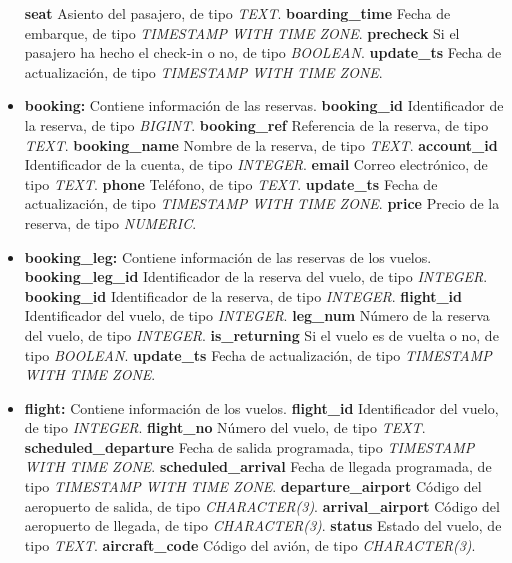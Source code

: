 \documentclass[11pt]{report}
\begin{document}
\begin{itemize}
    \subitem \textbf{seat} Asiento del pasajero, de tipo \emph{TEXT}.
    \subitem \textbf{boarding\_time} Fecha de embarque, de tipo \emph{TIMESTAMP WITH TIME ZONE}.
    \subitem \textbf{precheck} Si el pasajero ha hecho el check-in o no, de tipo \emph{BOOLEAN}.
    \subitem \textbf{update\_ts} Fecha de actualización, de tipo \emph{TIMESTAMP WITH TIME ZONE}.
  \item \textbf{booking:} Contiene información de las reservas.
    \subitem \textbf{booking\_id} Identificador de la reserva, de tipo \emph{BIGINT}.
    \subitem \textbf{booking\_ref} Referencia de la reserva, de tipo \emph{TEXT}.
    \subitem \textbf{booking\_name} Nombre de la reserva, de tipo \emph{TEXT}.
    \subitem \textbf{account\_id} Identificador de la cuenta, de tipo \emph{INTEGER}.
    \subitem \textbf{email} Correo electrónico, de tipo \emph{TEXT}.
    \subitem \textbf{phone} Teléfono, de tipo \emph{TEXT}.
    \subitem \textbf{update\_ts} Fecha de actualización, de tipo \emph{TIMESTAMP WITH TIME ZONE}.
    \subitem \textbf{price} Precio de la reserva, de tipo \emph{NUMERIC}.
  \item \textbf{booking\_leg:} Contiene información de las reservas de los vuelos.
    \subitem \textbf{booking\_leg\_id} Identificador de la reserva del vuelo, de tipo \emph{INTEGER}.
    \subitem \textbf{booking\_id} Identificador de la reserva, de tipo \emph{INTEGER}.
    \subitem \textbf{flight\_id} Identificador del vuelo, de tipo \emph{INTEGER}.
    \subitem \textbf{leg\_num} Número de la reserva del vuelo, de tipo \emph{INTEGER}.
    \subitem \textbf{is\_returning} Si el vuelo es de vuelta o no, de tipo \emph{BOOLEAN}.
    \subitem \textbf{update\_ts} Fecha de actualización, de tipo \emph{TIMESTAMP WITH TIME ZONE}.
  \item \textbf{flight:} Contiene información de los vuelos.
    \subitem \textbf{flight\_id} Identificador del vuelo, de tipo \emph{INTEGER}.
    \subitem \textbf{flight\_no} Número del vuelo, de tipo \emph{TEXT}.
    \subitem \textbf{scheduled\_departure} Fecha de salida programada, tipo \emph{TIMESTAMP WITH TIME ZONE}.
    \subitem \textbf{scheduled\_arrival} Fecha de llegada programada, de tipo \emph{TIMESTAMP WITH TIME ZONE}.
    \subitem \textbf{departure\_airport} Código del aeropuerto de salida, de tipo \emph{CHARACTER(3)}.
    \subitem \textbf{arrival\_airport} Código del aeropuerto de llegada, de tipo \emph{CHARACTER(3)}.
    \subitem \textbf{status} Estado del vuelo, de tipo \emph{TEXT}.
    \subitem \textbf{aircraft\_code} Código del avión, de tipo \emph{CHARACTER(3)}.

\end{itemize}
\end{document}
